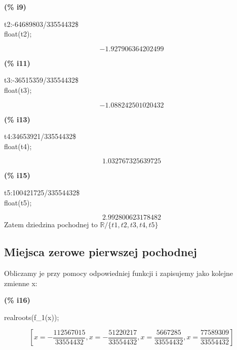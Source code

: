 \documentclass[a4paper]{article}
\begin{document}
\noindent
\begin{minipage}[t]{4.000000em}\color{red}\bfseries
(\% i9)	
\end{minipage}
\begin{minipage}[t]{\textwidth}\color{blue}
t2:-64689803/33554432\$\\
float(t2);
\end{minipage}
\[\displaystyle \tag{\% o9} 
-1.927906364202499\mbox{}
\]


\noindent
\begin{minipage}[t]{4.000000em}\color{red}\bfseries
(\% i11)	
\end{minipage}
\begin{minipage}[t]{\textwidth}\color{blue}
t3:-36515359/33554432\$\\
float(t3);
\end{minipage}
\[\displaystyle \tag{\% o11} 
-1.088242501020432\mbox{}
\]


\noindent
\begin{minipage}[t]{4.000000em}\color{red}\bfseries
(\% i13)	
\end{minipage}
\begin{minipage}[t]{\textwidth}\color{blue}
t4:34653921/33554432\$\\
float(t4);
\end{minipage}
\[\displaystyle \tag{\% o13} 
1.032767325639725\mbox{}
\]


\noindent
\begin{minipage}[t]{4.000000em}\color{red}\bfseries
(\% i15)	
\end{minipage}
\begin{minipage}[t]{\textwidth}\color{blue}
t5:100421725/33554432\$\\
float(t5);
\end{minipage}
\[\displaystyle \tag{\% o15} 
2.992800623178482\mbox{}
\]
Zatem dziedzina pochodnej to $\mathds{R}/\{t1,t2,t3,t4,t5\}$

\subsection{Miejsca zerowe pierwszej pochodnej}

Obliczamy je przy pomocy odpowiedniej funkcji i zapisujemy jako kolejne zmienne x:

\noindent
\begin{minipage}[t]{4.000000em}\color{red}\bfseries
(\% i16)	
\end{minipage}
\begin{minipage}[t]{\textwidth}\color{blue}
realroots(f\_1(x));
\end{minipage}
\[\displaystyle \tag{\% o16} 
\operatorname{[}x=-\frac{112567015}{33554432}\operatorname{,}x=-\frac{51220217}{33554432}\operatorname{,}x=\frac{5667285}{33554432}\operatorname{,
}x=\frac{77589309}{33554432}\operatorname{]}\mbox{}
\]
\end{document}
